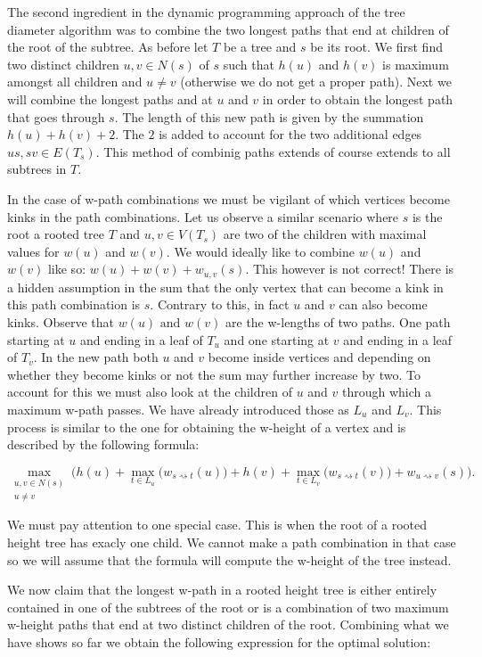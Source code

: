 The second ingredient in the dynamic programming approach of the tree diameter algorithm was to combine the two longest paths that end at children of the root of the subtree. As before let $T$ be a tree and $s$ be its root. We first find two distinct children $u, v \in N(s)$ of $s$ such that $h(u)$ and $h(v)$ is maximum amongst all children and $u \ne v$ (otherwise we do not get a proper path). Next we will combine the longest paths and at $u$ and $v$ in order to obtain the longest path that goes through $s$. The length of this new path is given by the summation $h(u) + h(v) + 2$. The $2$ is added to account for the two additional edges $us, sv \in E(T_s)$. This method of combinig paths extends of course extends to all subtrees in $T$.

In the case of w-path combinations we must be vigilant of which vertices become kinks in the path combinations. Let us observe a similar scenario where $s$ is the root a rooted tree $T$ and $u, v \in V(T_s)$ are two of the children with maximal values for $w(u)$ and $w(v)$. We would ideally like to combine $w(u)$ and $w(v)$ like so: $w(u) + w(v) + w_{u, v}(s)$. This however is not correct! There is a hidden assumption in the sum that the only vertex that can become a kink in this path combination is $s$. Contrary to this, in fact $u$ and $v$ can also become kinks. Observe that $w(u) \text{ and } w(v)$ are the w-lengths of two paths. One path starting at $u$ and ending in a leaf of $T_u$ and one starting at $v$ and ending in a leaf of $T_v$. In the new path both $u$ and $v$ become inside vertices and depending on whether they become kinks or not the sum may further increase by two. To account for this we must also look at the children of $u$ and $v$ through which a maximum w-path passes. We have already introduced those as $L_u$ and $L_v$. This process is similar to the one for obtaining the w-height of a vertex and is described by the following formula:

$$ \max\limits_{\substack{u, v \in N(s) \\ u \ne v}}\bigg( h(u) + \max\limits_{t \in L_u}\Big(w_{s \rightsquigarrow t}(u)\Big) + h(v) + \max\limits_{t \in L_v}\Big(w_{s \rightsquigarrow t}(v)\Big) + w_{u \rightsquigarrow v}(s)\bigg). $$

We must pay attention to one special case. This is when the root of a rooted height tree has exacly one child. We cannot make a path combination in that case so we will assume that the formula will compute the w-height of the tree instead.

We now claim that the longest w-path in a rooted height tree is either entirely contained in one of the subtrees of the root or is a combination of two maximum w-height paths that end at two distinct children of the root. Combining what we have shows so far we obtain the following expression for the optimal solution:

